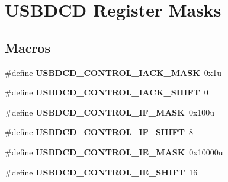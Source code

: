 \hypertarget{group__USBDCD__Register__Masks}{}\section{U\+S\+B\+D\+CD Register Masks}
\label{group__USBDCD__Register__Masks}
\subsection*{Macros}
\begin{DoxyCompactItemize}
\item 
\#define {\bfseries U\+S\+B\+D\+C\+D\+\_\+\+C\+O\+N\+T\+R\+O\+L\+\_\+\+I\+A\+C\+K\+\_\+\+M\+A\+SK}~0x1u\hypertarget{group__USBDCD__Register__Masks_ga23b5eadab7d4201af1198723a3b93ae5}{}\label{group__USBDCD__Register__Masks_ga23b5eadab7d4201af1198723a3b93ae5}

\item 
\#define {\bfseries U\+S\+B\+D\+C\+D\+\_\+\+C\+O\+N\+T\+R\+O\+L\+\_\+\+I\+A\+C\+K\+\_\+\+S\+H\+I\+FT}~0\hypertarget{group__USBDCD__Register__Masks_ga4a96149273b083d48c5917e9b915b92f}{}\label{group__USBDCD__Register__Masks_ga4a96149273b083d48c5917e9b915b92f}

\item 
\#define {\bfseries U\+S\+B\+D\+C\+D\+\_\+\+C\+O\+N\+T\+R\+O\+L\+\_\+\+I\+F\+\_\+\+M\+A\+SK}~0x100u\hypertarget{group__USBDCD__Register__Masks_gabedad7b2fec7990f45af8add013a19c7}{}\label{group__USBDCD__Register__Masks_gabedad7b2fec7990f45af8add013a19c7}

\item 
\#define {\bfseries U\+S\+B\+D\+C\+D\+\_\+\+C\+O\+N\+T\+R\+O\+L\+\_\+\+I\+F\+\_\+\+S\+H\+I\+FT}~8\hypertarget{group__USBDCD__Register__Masks_ga576f9434f9947991055f40c1ab3a38c1}{}\label{group__USBDCD__Register__Masks_ga576f9434f9947991055f40c1ab3a38c1}

\item 
\#define {\bfseries U\+S\+B\+D\+C\+D\+\_\+\+C\+O\+N\+T\+R\+O\+L\+\_\+\+I\+E\+\_\+\+M\+A\+SK}~0x10000u\hypertarget{group__USBDCD__Register__Masks_ga44f183d0863aeac1154727de57ee6fb6}{}\label{group__USBDCD__Register__Masks_ga44f183d0863aeac1154727de57ee6fb6}

\item 
\#define {\bfseries U\+S\+B\+D\+C\+D\+\_\+\+C\+O\+N\+T\+R\+O\+L\+\_\+\+I\+E\+\_\+\+S\+H\+I\+FT}~16\hypertarget{group__USBDCD__Register__Masks_ga33f53d29349cc16bb002486da4472ece}{}\label{group__USBDCD__Register__Masks_ga33f53d29349cc16bb002486da4472ece}


\end{DoxyCompactItemize}
